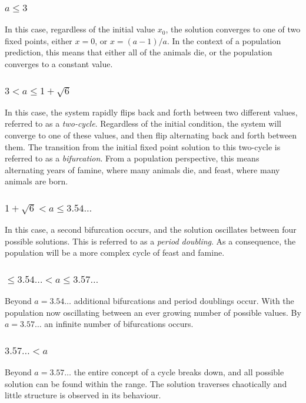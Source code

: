 \subsubsection{$a\leq 3$}
In this case, regardless of the initial value $x_0$, the solution converges to one of two fixed points, either $x=0$, or $x=(a-1)/a$. In the context of a population prediction, this means that either all of the animals die, or the population converges to a constant value.

\subsubsection{$ 3 < a \leq 1 + \sqrt{6}$}
In this case, the system rapidly flips back and forth between two different values, referred to as a {\it two-cycle}. Regardless of the initial condition, the system will converge to one of these values, and then flip alternating back and forth between them. The transition from the initial fixed point solution to this two-cycle is referred to as a {\it bifurcation}. From a population perspective, this means alternating years of famine, where many animals die, and feast, where many animals are born.

\subsubsection{$1 + \sqrt{6} < a \leq 3.54\hdots$}
In this case, a second bifurcation occurs, and the solution oscillates between four possible solutions. This is referred to as a {\it period doubling}. As a consequence, the population will be a more complex cycle of feast and famine.

\subsubsection{$\leq 3.54\hdots < a \leq 3.57\hdots$}
Beyond $a = 3.54\hdots$ additional bifurcations and period doublings occur. With the population now oscillating between an ever growing number of possible values. By $a = 3.57\hdots$ an infinite number of bifurcations occurs. 

\subsubsection{$3.57\hdots < a $}
Beyond $a = 3.57\hdots$ the entire concept of a cycle breaks down, and all possible solution can be found within the range. The solution traverses chaotically and little structure is observed in its behaviour.\\


